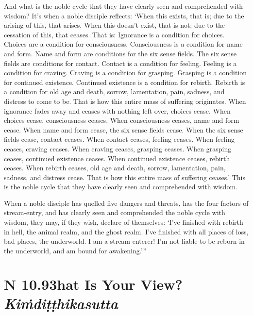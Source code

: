 \documentclass[12pt,openany]{book}%
\newcommand*{\suttatitleacronym}[1]{\smaller[2]{#1}\vspace*{.3em}}
\newcommand*{\suttatitletranslation}[1]{\linebreak{#1}}
\newcommand*{\suttatitleroot}[1]{\linebreak\smaller[2]\itshape{#1}}
\newcommand*{\tocacronym}[1]{\hspace*{-3.3em}{#1}\quad}
\newcommand*{\toctranslation}[1]{#1}
\newcommand*{\tocroot}[1]{(\textit{#1})}
\begin{document}
And what is the noble cycle that they have clearly seen and comprehended with wisdom? It’s when a noble disciple reflects: ‘When this exists, that is; due to the arising of this, that arises. When this doesn’t exist, that is not; due to the cessation of this, that ceases. That is: Ignorance is a condition for choices. Choices are a condition for consciousness. Consciousness is a condition for name and form. Name and form are conditions for the six sense fields. The six sense fields are conditions for contact. Contact is a condition for feeling. Feeling is a condition for craving. Craving is a condition for grasping. Grasping is a condition for continued existence. Continued existence is a condition for rebirth. Rebirth is a condition for old age and death, sorrow, lamentation, pain, sadness, and distress to come to be. That is how this entire mass of suffering originates. When ignorance fades away and ceases with nothing left over, choices cease. When choices cease, consciousness ceases. When consciousness ceases, name and form cease. When name and form cease, the six sense fields cease. When the six sense fields cease, contact ceases. When contact ceases, feeling ceases. When feeling ceases, craving ceases. When craving ceases, grasping ceases. When grasping ceases, continued existence ceases. When continued existence ceases, rebirth ceases. When rebirth ceases, old age and death, sorrow, lamentation, pain, sadness, and distress cease. That is how this entire mass of suffering ceases.’ This is the noble cycle that they have clearly seen and comprehended with wisdom. 

When a noble disciple has quelled five dangers and threats, has the four factors of stream-entry, and has clearly seen and comprehended the noble cycle with wisdom, they may, if they wish, declare of themselves: ‘I’ve finished with rebirth in hell, the animal realm, and the ghost realm. I’ve finished with all places of loss, bad places, the underworld. I am a stream-enterer! I’m not liable to be reborn in the underworld, and am bound for awakening.’” 

%
\section*{{\suttatitleacronym AN 10.93}{\suttatitletranslation What Is Your View? }{\suttatitleroot Kiṁdiṭṭhikasutta}}
\addcontentsline{toc}{section}{\tocacronym{AN 10.93} \toctranslation{What Is Your View? } \tocroot{Kiṁdiṭṭhikasutta}}
\end{document}
